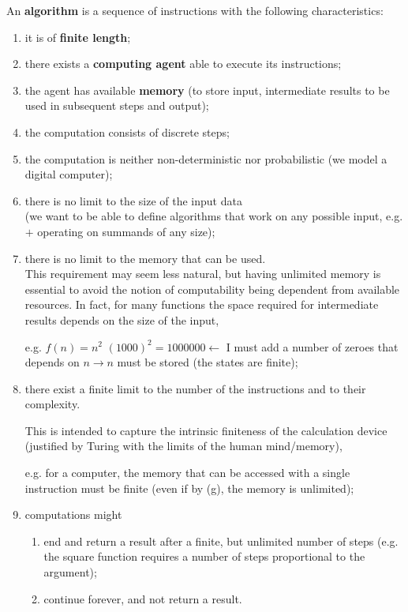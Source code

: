 An \textbf{algorithm} is a sequence of instructions with the following characteristics:
\begin{enumerate}[label=\alph*)]
\item
  \label{as:prog_fin}
  it is of \textbf{finite length};
\item there exists a \textbf{computing agent} able to execute its instructions;
\item the agent has available \textbf{memory} (to store input, intermediate results to be used in subsequent steps and output);
\item the computation consists of discrete steps;
\item the computation is neither non-deterministic nor probabilistic (we model a digital computer);

\item there is no limit to the size of the input data\\
  (we want to be able to define algorithms that work on any possible
  input, e.g. $+$ operating on summands of any size);

\item there is no limit to the memory that can be used.\\
  This requirement may seem less natural, but having unlimited memory is essential to avoid the notion of computability being dependent
  from available resources. In fact, for many
  functions the space required for intermediate results depends on
  the size of the input,

  e.g. $f(n) = n^2$ $(1000)^2 = 1000000 \leftarrow$ I must add a
  number of zeroes that depends on $n \rightarrow n$ must be stored
  (the states are finite);

\item
  \label{as:istr_fin}
  there exist a finite limit to the number of the
  instructions and to their complexity.

  This is intended to capture the intrinsic finiteness of the
  calculation device (justified by Turing with the limits of the human
  mind/memory),

  e.g. for a computer, the memory that can be accessed with a single
  instruction must be finite (even if by (g), the memory is unlimited);

\item computations might
  \begin{enumerate}

  \item  end and return a result after a finite, but unlimited number of steps
    (e.g. the square function requires a number of steps proportional to the argument);

  \item continue forever, and not return a result.
  \end{enumerate}
\end{enumerate}

